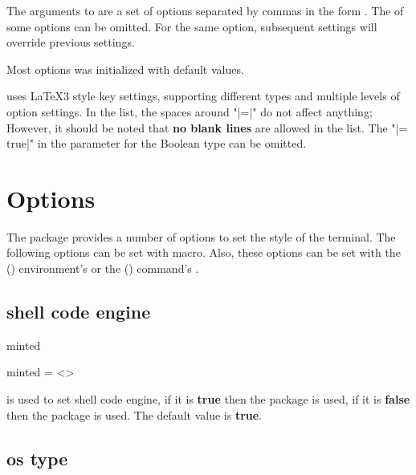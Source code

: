 \documentclass{ctxdoc}
\begin{document}
 \begin{function}[added=2021-12-18,updated=2021-12-18]{\termset}
   \begin{syntax}
      
   \end{syntax}
   The arguments to  are a set of options separated by commas
   in the form .
   The  of some options can be omitted.
   For the same option, subsequent settings will override previous settings.

   Most options was initialized with default values.

     uses \LaTeX3 style key settings,
   supporting different types and multiple levels of option settings.
   In the  list, the spaces around "|=|"
   do not affect anything; However, it should be noted that \textbf{no blank lines}
   are allowed in the list.
   The "|= true|" in the parameter  for the Boolean type can be omitted.

 \end{function}

 \section{Options}

 The  package provides a number of options to set the style of the terminal.
 The following options can be set with  macro.
 Also, these options can be set with the () environment's
 or the () command's .

 \subsection{shell code engine}

 \begin{function}[added=2021-12-18,updated=2021-12-18]{minted}
   \begin{syntax}
     minted = <\TTF> 
   \end{syntax}
    is used to set shell code engine, if it is \textbf{true} then
   the  package is used, if it is \textbf{false} then
   the  package is used. The default value is \textbf{true}.
 \end{function}

 \subsection{os type}
\end{document}
